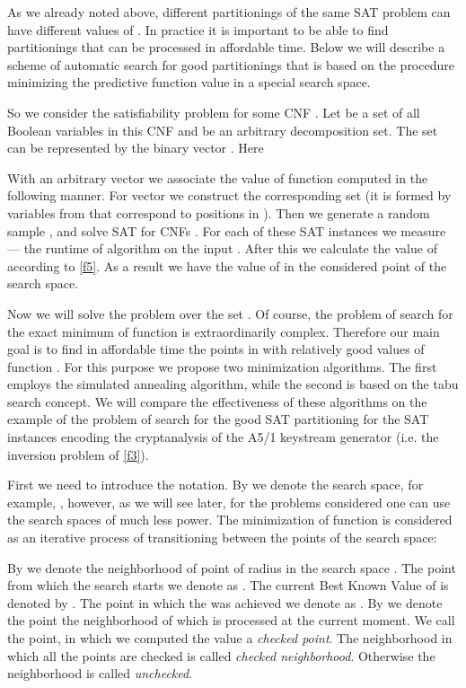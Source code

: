 \documentclass[runningheads,a4paper]{llncs}
\begin{document}
As we already noted above, different partitionings of the same SAT problem can have different values of . In practice it is important to be able to find partitionings that can be processed in affordable time. Below we will describe a scheme of automatic search for good partitionings that is based on the procedure minimizing the predictive function value in a special search space.

So we consider the satisfiability problem for some CNF . Let  be a set of all Boolean variables in this CNF and  be an arbitrary decomposition set. The set  can be represented by the binary vector . Here 

With an arbitrary vector  we associate the value of function  computed in the following manner. For vector  we construct the corresponding set  (it is formed by variables from  that correspond to  positions in ). Then we generate a random sample ,  and solve SAT for CNFs . For each of these SAT instances we measure  --- the runtime of algorithm  on the input . After this we calculate the value of  according to \eqref{f5}. As a result we have the value of  in the considered point of the search space.

Now we will solve the problem  over the set . Of course, the problem of search for the exact minimum of function  is extraordinarily complex. Therefore our main goal is to find in affordable time the points in  with relatively good values of function . For this purpose we propose two minimization algorithms. The first employs the simulated annealing algorithm, while the second is based on the tabu search concept. We will compare the effectiveness of these algorithms on the example of the problem of search for the good SAT partitioning for the SAT instances encoding the cryptanalysis of the A5/1 keystream generator (i.e. the inversion problem of \eqref{f3}). 

First we need to introduce the notation. By  we denote the search space, for example, , however, as we will see later, for the problems considered one can use the search spaces of much less power. The minimization of function  is considered as an iterative process of transitioning between the points of the search space:

By  we denote the neighborhood of point  of radius  in the search space . The point from which the search starts we denote as . The current Best Known Value of  is denoted by . The point in which the  was achieved we denote as . By  we denote the point the neighborhood of which is processed at the current moment. We call the point, in which we computed the value  a \textit{checked point}. The neighborhood  in which all the points are checked is called \textit{checked neighborhood}. Otherwise the neighborhood is called \textit{unchecked}. 
\end{document}
